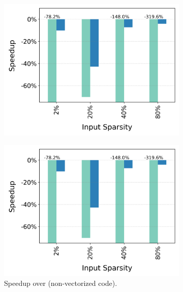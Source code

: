 \begin{figure}[t]
  \begin{subfigure}{5cm}
    \centering
    \includegraphics[width=\textwidth]{Figures/Evaluations/chart.png}
  \end{subfigure}
  \begin{subfigure}{.499\textwidth}
    \centering
    \includegraphics[width=\textwidth]{Figures/Evaluations/chart.png}
    \caption{Speedup over \scalar (non-vectorized code).}
     \label{fig:if-then-else-few-scatter-speedup}
  \end{subfigure}%
  \begin{subfigure}{.499\textwidth}
        \centering

\end{subfigure}
\end{figure}

